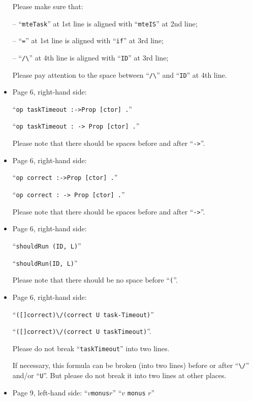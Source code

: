 \documentclass[12pt,onecolumn]{IEEEtranTIE}
\begin{document}
\begin{itemize}
Please make sure that: 

-- ``\verb|mteTask|'' at 1st line is aligned with ``\verb|mteIS|'' at
2nd line;

-- ``\verb|=|'' at 1st line is aligned with ``\verb|if|'' at 3rd line;

-- ``\verb|/\|'' at 4th line is aligned with ``\verb|ID|'' at 3rd line;

Please pay attention to the space between ``\verb|/\|'' and
``\verb|ID|'' at 4th line.


\item Page 6, right-hand side:

``\verb|op taskTimeout :->Prop [ctor] .|'' 

\by
  
``\verb|op taskTimeout : -> Prop [ctor] .|''

Please note that there should be spaces before and after
``\verb|->|''.


\item Page 6, right-hand side:

``\verb|op correct :->Prop [ctor] .|'' 

\by
  
``\verb|op correct : -> Prop [ctor] .|'' 

Please note that there should be spaces before and after
``\verb|->|''.


\item Page 6, right-hand side:

``\verb|shouldRun (ID, L)|'' 

\by

``\verb|shouldRun(ID, L)|'' 

Please note that there should be no space before ``\verb|(|''.


\item Page 6, right-hand side:

``\verb|([]correct)\/(correct U task-Timeout)|'' 

\by

``\verb|([]correct)\/(correct U taskTimeout)|''.

Please do not break ``\verb|taskTimeout|'' into two lines.

If necessary, this formula can be broken (into two lines) before or
after ``\verb|\/|'' and/or ``\verb|U|''. But please do not break it
into two lines at other places.

\item Page 9, left-hand side:
``$v$\verb|monus|$r$'' \by ``$v$ \verb|monus| $r$''


\end{itemize}
\end{document}
